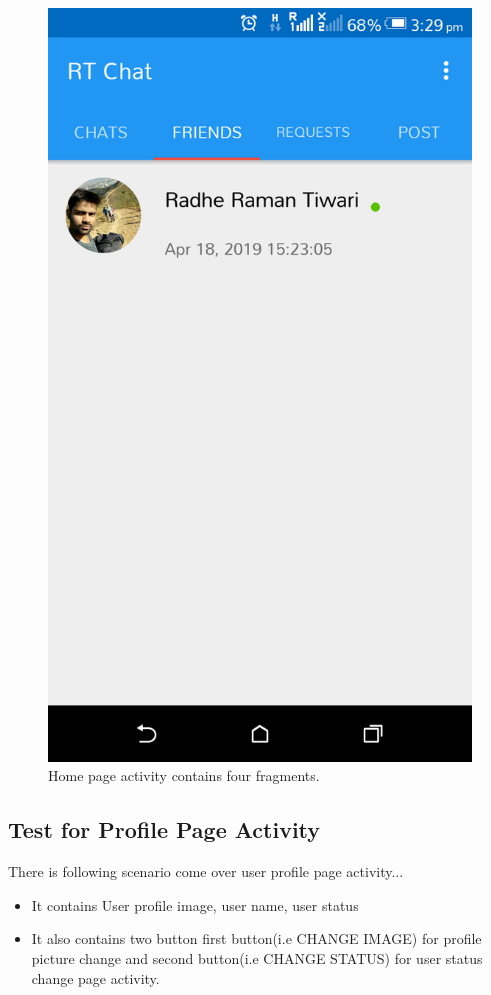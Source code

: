 \begin{figure}[!ht]
	\centering
	\includegraphics[scale=0.2]{home.png}
	\caption{\label{img15}  Home page activity contains four fragments.}
\end{figure}


\subsection{Test for Profile Page Activity}
There is following scenario come over user profile page activity...
\begin{itemize}
	\item It contains User profile image, user name, user status
	\item It also contains two button first button(i.e CHANGE IMAGE) for profile picture change and second button(i.e CHANGE STATUS) for user status change page activity.
\end{itemize}

